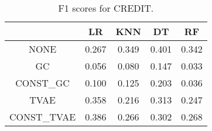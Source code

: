 \begin{table}
\caption{F1 scores for CREDIT.}
\label{tab:f1-CREDIT}
\begin{tabular}{ccccc}
\toprule
 & LR & KNN & DT & RF \\
\midrule
NONE & 0.267 & 0.349 & 0.401 & 0.342 \\
GC & 0.056 & 0.080 & 0.147 & 0.033 \\
CONST\_GC & 0.100 & 0.125 & 0.203 & 0.036 \\
TVAE & 0.358 & 0.216 & 0.313 & 0.247 \\
CONST\_TVAE & 0.386 & 0.266 & 0.302 & 0.268 \\
\bottomrule
\end{tabular}
\end{table}
